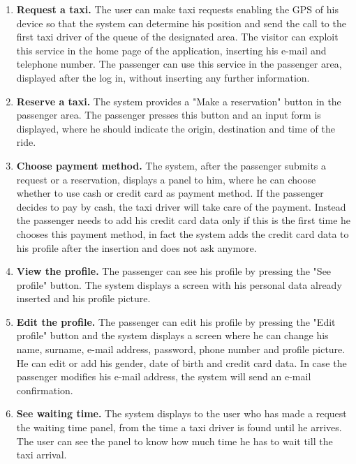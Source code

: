 \documentclass[18pt,oneside,a4paper, titlepage]{article}
\begin{document}
\begin{enumerate}
			\item \textbf{Request a taxi.}
				The user can make taxi requests enabling the GPS of his device so that the system can determine his position and send the call to the first taxi driver of the queue of the designated area.
				The visitor can exploit this service in the home page of the application, inserting his e-mail and telephone number.
				The passenger can use this service in the passenger area, displayed after the log in, without inserting any further information.
				
			\item \textbf{Reserve a taxi.}
				The system provides a "Make a reservation" button in the passenger area. The passenger presses this button and an input form is displayed, where he should indicate the origin, destination and time of the ride.
				
				
			\item \textbf{Choose payment method.}
				The system, after the passenger submits a request or a reservation, displays a panel to him, where he can choose whether to use cash or credit card as payment method. If the passenger decides to pay by cash, the taxi driver will take care of the payment. Instead the passenger needs to add his credit card data only if this is the first time he chooses this payment method, in fact the system adds the credit card data to his profile after the insertion and does not ask anymore. 
				
			\item \textbf{View the profile.}
				The passenger can see his profile by pressing the "See profile" button. The system displays a screen with his personal data already inserted and his profile picture.
				
			\item \textbf{Edit the profile.}
				 The passenger can edit his profile by pressing the "Edit profile" button and the system displays a screen where he can change his name, surname, e-mail address, password, phone number and profile picture. He can edit or add his gender, date of birth and credit card data. In case the passenger modifies his e-mail address, the system will send an e-mail confirmation.
				 
			\item \textbf{See waiting time.}
				The system displays to the user who has made a request the waiting time panel, from the time a taxi driver is found until he arrives. The user can see the panel to know how much time he has to wait till the taxi arrival.
				

\end{enumerate}
\end{document}
